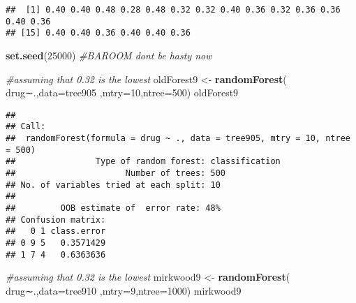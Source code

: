 \documentclass[]{article}
\newenvironment{Shaded}{\begin{snugshade}}{\end{snugshade}}
\newcommand{\KeywordTok}[1]{\textcolor[rgb]{0.13,0.29,0.53}{\textbf{#1}}}
\newcommand{\DataTypeTok}[1]{\textcolor[rgb]{0.13,0.29,0.53}{#1}}
\newcommand{\DecValTok}[1]{\textcolor[rgb]{0.00,0.00,0.81}{#1}}
\newcommand{\StringTok}[1]{\textcolor[rgb]{0.31,0.60,0.02}{#1}}
\newcommand{\CommentTok}[1]{\textcolor[rgb]{0.56,0.35,0.01}{\textit{#1}}}
\newcommand{\ControlFlowTok}[1]{\textcolor[rgb]{0.13,0.29,0.53}{\textbf{#1}}}
\newcommand{\OperatorTok}[1]{\textcolor[rgb]{0.81,0.36,0.00}{\textbf{#1}}}
\newcommand{\NormalTok}[1]{#1}
\begin{document}
\begin{Shaded}
\end{Shaded}

\begin{verbatim}
##  [1] 0.40 0.40 0.48 0.28 0.48 0.32 0.32 0.40 0.36 0.32 0.36 0.36 0.40 0.36
## [15] 0.40 0.40 0.36 0.40 0.40 0.36
\end{verbatim}

\begin{Shaded}
\begin{Highlighting}[]
\KeywordTok{set.seed}\NormalTok{(}\DecValTok{25000}\NormalTok{)}
\CommentTok{#BAROOM dont be hasty now}

\CommentTok{#assuming that 0.32 is the lowest}
\NormalTok{oldForest9 <-}\StringTok{ }\KeywordTok{randomForest}\NormalTok{( drug∼.,}\DataTypeTok{data=}\NormalTok{tree905  ,}\DataTypeTok{mtry=}\DecValTok{10}\NormalTok{,}\DataTypeTok{ntree=}\DecValTok{500}\NormalTok{)}
\NormalTok{oldForest9}
\end{Highlighting}
\end{Shaded}

\begin{verbatim}
## 
## Call:
##  randomForest(formula = drug ~ ., data = tree905, mtry = 10, ntree = 500) 
##                Type of random forest: classification
##                      Number of trees: 500
## No. of variables tried at each split: 10
## 
##         OOB estimate of  error rate: 48%
## Confusion matrix:
##   0 1 class.error
## 0 9 5   0.3571429
## 1 7 4   0.6363636
\end{verbatim}

\begin{Shaded}
\begin{Highlighting}[]
\CommentTok{#assuming that 0.32 is the lowest}
\NormalTok{mirkwood9 <-}\StringTok{ }\KeywordTok{randomForest}\NormalTok{( drug∼.,}\DataTypeTok{data=}\NormalTok{tree910  ,}\DataTypeTok{mtry=}\DecValTok{9}\NormalTok{,}\DataTypeTok{ntree=}\DecValTok{1000}\NormalTok{)}
\NormalTok{mirkwood9}
\end{Highlighting}
\end{Shaded}
\end{document}
